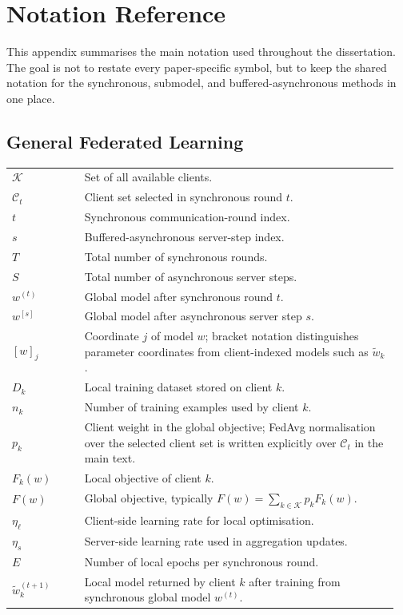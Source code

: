 \chapter{Notation Reference}
\label{chap:notation}

This appendix summarises the main notation used throughout the dissertation. The goal is not to restate every paper-specific symbol, but to keep the shared notation for the synchronous, submodel, and buffered-asynchronous methods in one place.

\section*{General Federated Learning}
\vspace{-1em}
\begin{longtable}{@{} p{0.18\linewidth} p{0.78\linewidth} @{}}
$\mathcal{K}$ & Set of all available clients. \\
$\mathcal{C}_t$ & Client set selected in synchronous round $t$. \\
$t$ & Synchronous communication-round index. \\
$s$ & Buffered-asynchronous server-step index. \\
$T$ & Total number of synchronous rounds. \\
$S$ & Total number of asynchronous server steps. \\
$w^{(t)}$ & Global model after synchronous round $t$. \\
$w^{[s]}$ & Global model after asynchronous server step $s$. \\
$[w]_j$ & Coordinate \(j\) of model \(w\); bracket notation distinguishes parameter coordinates from client-indexed models such as \(\tilde{w}_k\). \\
$D_k$ & Local training dataset stored on client $k$. \\
$n_k$ & Number of training examples used by client $k$. \\
$p_k$ & Client weight in the global objective; FedAvg normalisation over the selected client set is written explicitly over $\mathcal{C}_t$ in the main text. \\
$F_k(w)$ & Local objective of client $k$. \\
$F(w)$ & Global objective, typically $F(w)=\sum_{k \in \mathcal{K}} p_k F_k(w)$. \\
$\eta_\ell$ & Client-side learning rate for local optimisation. \\
$\eta_s$ & Server-side learning rate used in aggregation updates. \\
$E$ & Number of local epochs per synchronous round. \\
$\tilde{w}_k^{(t+1)}$ & Local model returned by client $k$ after training from synchronous global model $w^{(t)}$. \\
\end{longtable}

